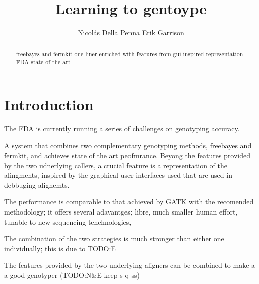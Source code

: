 \documentclass{article}
\title{Learning to gentoype}
\author{
Nicol\'as Della Penna
\And
Erik Garrison \\
} %
\begin{document}

\maketitle

\begin{abstract}
freebayes and fermkit one liner
enriched with features from gui inspired representation
FDA state of the art
\end{abstract}

\section{Introduction}

The FDA is currently running a series of challenges on genotyping accuracy.

A system that combines two complementary genotyping methods, freebayes and fermkit, and achieves state of the art peofmrance.
Beyong the features provided by the two udnerlying callers, a crucial feature is a representation of the alingments, inspired by the graphical user interfaces used that are used in debbuging alignemts.

The performance is comparable to that achieved by GATK with the recomended methodology; it offers several adavantges; libre, much smaller human effort, tunable to new sequencing tenchnologies,  



The combination of the two strategies is much stronger than either one individually; this is due to TODO:E



The features provided by the two underlying aligners can be combined to make a a good genotyper (TODO:N&E keep s q ss)


\end{document}
